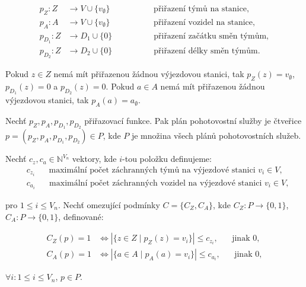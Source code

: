 \begin{definice}
  \begin{align*}
    p_Z \colon Z &\rightarrow V \cup \{ v_{\emptyset} \}                   \hspace{63pt} \text{přiřazení týmů na stanice}, \\
    p_A \colon A &\rightarrow V \cup \{ v_{\emptyset} \}                   \hspace{63pt} \text{přiřazení vozidel na stanice}, \\ 
    p_{D_{1}} \colon Z &\rightarrow D_{1} \cup \{ 0 \}         \hspace{60pt} \text{přiřazení začátku směn týmům}, \\
    p_{D_{2}} \colon Z &\rightarrow D_{2} \cup \{ 0 \}         \hspace{60pt} \text{přiřazení délky směn týmům}.
  \end{align*}

  Pokud $z \in Z$ nemá mít přiřazenou žádnou výjezdovou stanici,
  tak $p_{Z}(z) = v_{\emptyset}$, $p_{D_{1}}(z) = 0$ a $p_{D_{2}}(z) = 0$.
  Pokud $a \in A$ nemá mít přiřazenou žádnou výjezdovou stanici, tak $p_{A}(a) = a_{\emptyset}$.
\end{definice}

\begin{definice}
  Nechť $p_Z, p_A, p_{D_{1}}, p_{D_{2}}$ přiřazovací funkce.
  Pak plán pohotovostní služby je čtveřice $p = (p_Z, p_A, p_{D_{1}}, p_{D_{2}}) \in P$, kde $P$ je množina všech plánů pohotovostních služeb.
\end{definice}

\begin{definice}
  Nechť $c_z, c_a \in \mathbb{N}^{V_n}$ vektory, 
  kde $i$-tou položku definujeme:
  \begin{align*}
    &c_{z_{i}} \hspace{20pt} \text{maximální počet záchranných týmů na výjezdové stanici $v_i \in V$}, \\ 
    &c_{a_{i}} \hspace{20pt} \text{maximální počet záchranných vozidel na výjezdové stanici $v_i \in V$},
  \end{align*}

  pro $1 \leq i \leq V_n$.
  Nechť omezující podmínky $C = \{ C_Z, C_A \}$, kde $C_Z \colon P \rightarrow \{ 0, 1 \}$, $C_A \colon P \rightarrow \{ 0, 1 \}$, definované:

  \begin{align*}
    C_Z(p) = 1 &\iff |\{ z \in Z \mid p_Z(z) = v_i \}| \leq c_{z_{i}}, \hspace{20pt} \text{jinak 0}, \\
    C_A(p) = 1 &\iff |\{ a \in A \mid p_A(a) = v_i \}| \leq c_{a_{i}}, \hspace{20pt} \text{jinak 0},
  \end{align*}

  $\forall i \colon 1 \leq i \leq V_n$, $p \in P$.
\end{definice}

